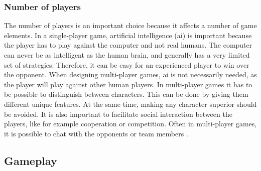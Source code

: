\subsubsection{Number of players}
\label{subsec:numbers}
The number of players is an important choice because it affects a number of game elements. In a single-player game, artificial intelligence (\ac{ai}) is important because the player has to play against the computer and not real humans. The computer can never be as intelligent as the human brain, and generally has a very limited set of strategies. Therefore, it can be easy for an experienced player to win over the opponent. When designing multi-player games, \ac{ai} is not necessarily needed, as the player will play against other human players. In multi-player games it has to be possible to distinguish between characters. This can be done by giving them different unique features. At the same time, making any character superior should be avoided. It is also important to facilitate social interaction between the players, like for example cooperation or competition. Often in multi-player games, it is possible to chat with the opponents or team members \cite{understandingvg}. 

\subsection{Gameplay}

